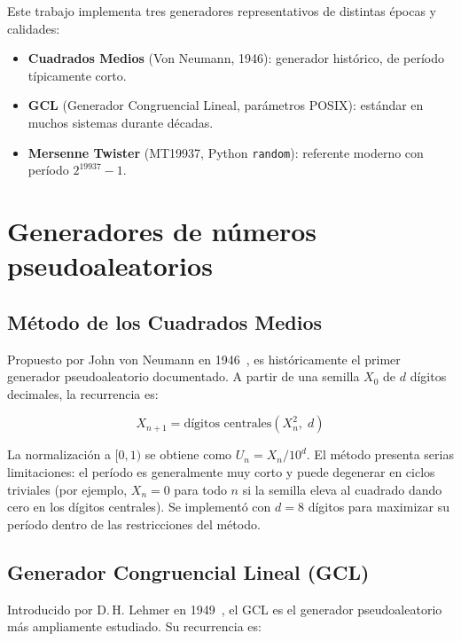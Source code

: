 \documentclass{article}
\begin{document}
Este trabajo implementa tres generadores representativos de distintas épocas
y calidades:
\begin{itemize}
  \item \textbf{Cuadrados Medios} (Von Neumann, 1946): generador histórico,
        de período típicamente corto.
  \item \textbf{GCL} (Generador Congruencial Lineal, parámetros POSIX):
        estándar en muchos sistemas durante décadas.
  \item \textbf{Mersenne Twister} (MT19937, Python \texttt{random}):
        referente moderno con período $2^{19937}-1$.
\end{itemize}

\section{Generadores de números pseudoaleatorios}

\subsection{Método de los Cuadrados Medios}

Propuesto por John von Neumann en 1946~\cite{metropolis1987}, es
históricamente el primer generador pseudoaleatorio documentado.  A partir
de una semilla $X_0$ de $d$ dígitos decimales, la recurrencia es:

\begin{equation}
  X_{n+1} = \text{dígitos centrales}\!\left(X_n^2,\; d\right)
  \label{eq:cuadrados}
\end{equation}

La normalización a $[0,1)$ se obtiene como $U_n = X_n / 10^d$.
El método presenta serias limitaciones: el período es generalmente muy
corto y puede degenerar en ciclos triviales (por ejemplo, $X_n = 0$
para todo $n$ si la semilla eleva al cuadrado dando cero en los dígitos
centrales).  Se implementó con $d=8$ dígitos para maximizar su período
dentro de las restricciones del método.

\subsection{Generador Congruencial Lineal (GCL)}

Introducido por D.\,H. Lehmer en 1949~\cite{lehmer1951}, el GCL es el
generador pseudoaleatorio más ampliamente estudiado.  Su recurrencia es:
\end{document}
